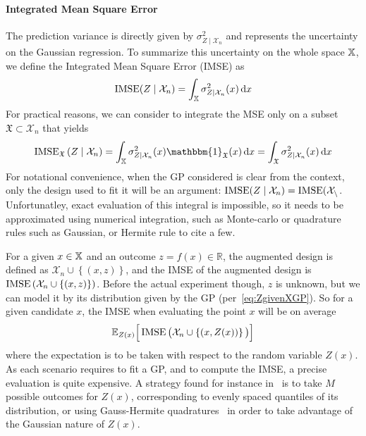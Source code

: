\documentclass[../../Main_ManuscritThese.tex]{subfiles}
\begin{document}
\paragraph{Integrated Mean Square Error}
The prediction variance is directly given by
$\sigma^2_{Z\mid \mathcal{X}_n}$ and represents the uncertainty on the
Gaussian regression. To summarize this uncertainty on the whole space
$\mathbb{X}$, we define the Integrated Mean Square Error
(IMSE)\cite{sacks_designs_1989} as
\begin{equation}
  \operatorname{\mathrm{IMSE}}(Z \mid \mathcal{X}_n) = \int_{\mathbb{X}} \sigma_{Z\mid\mathcal{X}_n}^2(x)\,\mathrm{d}x
\end{equation}
For practical reasons, we can consider to integrate the MSE only on a
subset $\mathfrak{X}\subset \mathcal{X}_n$ that yields
\begin{equation}
  \IMSE_{\mathfrak{X}}\left(Z \mid \mathcal{X}_n \right) = \int_{\Xspace} \sigma^2_{Z\mid \mathcal{X}_n}(x)  \mathbbm{1}_{\mathfrak{X}}(x)\,\mathrm{d}x = \int_{\mathfrak{X}} \sigma^2_{Z\mid \mathcal{X}_n}(x)\,\mathrm{d}x
\end{equation}
For notational convenience, when the GP considered is clear from the
context, only the design used to fit it will be an argument:
$\operatorname{\mathrm{IMSE}}(Z \mid \mathcal{X}_n) = \operatorname{\mathrm{IMSE}}(\mathcal{X_n}$.  Unfortunatley, 
exact evaluation of this integral is impossible, so it needs to be
approximated using numerical integration, such as Monte-carlo or
quadrature rules such as Gaussian, or Hermite rule to cite a
few.%


For a given $x\in \mathbb{X}$ and an outcome $z=f(x)\in \mathbb{R}$, the
augmented design is defined as
$\mathcal{X}_n \cup \left\{(x, z)\right\}$, and the IMSE of the
augmented design is
$\operatorname{\mathrm{IMSE}}\left(\mathcal{X}_n \cup \left\{(x, z)\right\} \right)$.
Before the actual experiment though, $z$ is unknown, but we can model
it by its distribution given by the GP (per~\cref{eq:ZgivenXGP}). So
for a given candidate $x$, the IMSE when evaluating the point $x$ will
be on average
\begin{equation}
  \label{eq:IMSE_augmented}
  \mathbb{E}_{Z(x)}\Big[\operatorname{\mathrm{IMSE}}\big(\mathcal{X}_n \cup \left\{(x, Z(x))\right\} \big)\Big]
\end{equation}
where the expectation is to be taken with respect to the random
variable $Z(x)$. As each scenario requires to fit a GP, and to compute
the IMSE, a precise evaluation is quite expensive. A strategy found
for instance in~\cite{villemonteix_informational_2006} is to take $M$
possible outcomes for $Z(x)$, corresponding to evenly spaced quantiles
of its distribution, or using Gauss-Hermite
quadratures~\cite{bernard_methodes_2019} in order to take advantage of
the Gaussian nature of $Z(x)$.
\end{document}
